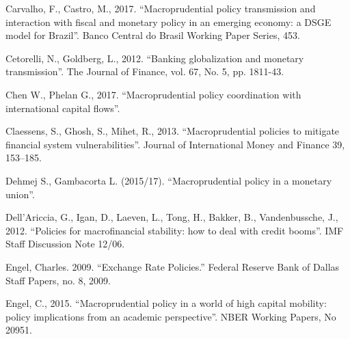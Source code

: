 \documentclass[12pt,a4paper]{article}
\begin{document}

Carvalho, F., Castro, M., 2017. “Macroprudential policy transmission and interaction with fiscal and monetary policy in an emerging economy: a DSGE model for Brazil”. Banco Central do Brasil Working Paper Series, 453.


Cetorelli, N., Goldberg, L., 2012. “Banking globalization and monetary transmission”. The Journal of Finance, vol. 67, No. 5, pp. 1811-43.

Chen W., Phelan G., 2017. “Macroprudential policy coordination with international capital flows”. 


Claessens, S., Ghosh, S., Mihet, R., 2013. “Macroprudential policies to mitigate financial
system vulnerabilities”. Journal of International Money and Finance 39, 153–185.




Dehmej S., Gambacorta L. (2015/17). “Macroprudential policy in a monetary union”.

Dell’Ariccia, G., Igan, D., Laeven, L., Tong, H., Bakker, B., Vandenbussche, J., 2012.
“Policies for macrofinancial stability: how to deal with credit booms”. IMF Staff
Discussion Note 12/06.


Engel, Charles. 2009. “Exchange Rate Policies.” Federal Reserve Bank of Dallas Staff Papers, no. 8, 2009.

Engel, C., 2015. “Macroprudential policy in a world of high capital mobility: policy implications from an academic perspective”. NBER Working Papers, No 20951.
\end{document}
